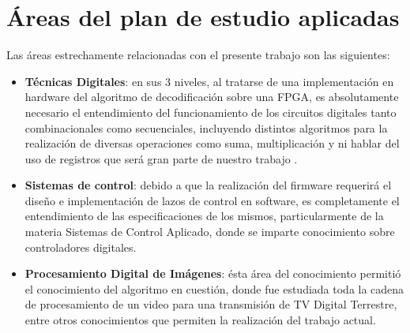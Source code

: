 
\section{Áreas del plan de estudio aplicadas}
\label{sec:areas}

Las áreas estrechamente relacionadas con el presente trabajo son las siguientes:

\begin{itemize}
\item \textbf{Técnicas Digitales}: en sus 3 niveles, al tratarse de una implementación en hardware del algoritmo de decodificación sobre una FPGA, es absolutamente necesario el entendimiento del funcionamiento de los circuitos digitales tanto combinacionales como secuenciales, incluyendo distintos algoritmos para la realización de diversas operaciones como suma, multiplicación y ni hablar del uso de registros que será gran parte de nuestro trabajo . 
\item \textbf{Sistemas de control}: debido a que la realización del firmware requerirá el diseño e implementación de lazos de control en software, es completamente el entendimiento de las especificaciones de los mismos, particularmente de la materia Sistemas de Control Aplicado, donde se imparte conocimiento sobre controladores digitales.
\item \textbf{Procesamiento Digital de Imágenes}: ésta área del conocimiento permitió el conocimiento del algoritmo en cuestión, donde fue estudiada toda la cadena de procesamiento de un video para una transmisión de TV Digital Terrestre, entre otros conocimientos que permiten la realización del trabajo actual.
\end{itemize}


